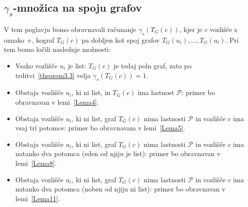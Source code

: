 \documentclass[12pt,a4paper,twoside]{article}
\theoremstyle{definition} %
\theoremstyle{plain} %
\numberwithin{equation}{section}  %
\begin{document}
\subsection{$\gamma_s$-množica na spoju grafov}
V tem poglavju bomo obravnavali računanje $\gamma_s(T_G(c))$, kjer je $c$ vozlišče z oznako $+$, kograf $T_G(c)$ pa dobljen kot spoj grafov $T_G(u_i), ..., T_G(u_l)$. Pri tem bomo ločili naslednje možnosti:
\begin{itemize}
\item Vsako vozlišče $u_i$ je list: $T_G(c)$ je tedaj poln graf, zato po trditvi~\ref{theorem3.3} velja $\gamma_s(T_G(c))=1$.
\item Obstaja vozlišče $u_i$, ki ni list, in $T_G(c)$ ima lastnost $\mathcal{P}$: primer bo obravnavan v lemi~\ref{Lema4}.
\item Obstaja vozlišče $u_i$, ki ni list, graf $T_G(c)$ nima lastnosti $\mathcal{P}$ in vozlišče $c$ ima vsaj tri potomce: primer bo obravnavam v lemi~\ref{Lema5}.
\item Obstaja vozlišče $u_i$, ki ni list, graf $T_G(c)$ nima lastnosti $\mathcal{P}$ in vozlišče $c$ ima natanko dva potomca (eden od njiju je list): primer bo obravnavan v lemi~\ref{Lema8}.
\item Obstaja vozlišče $u_i$, ki ni list, graf $T_G(c)$ nima lastnosti $\mathcal{P}$ in vozlišče $c$ ima natanko dva potomca (noben od njiju ni list): primer bo obravnavan v lemi~\ref{Lema11}.
\end{itemize}
\end{document}
